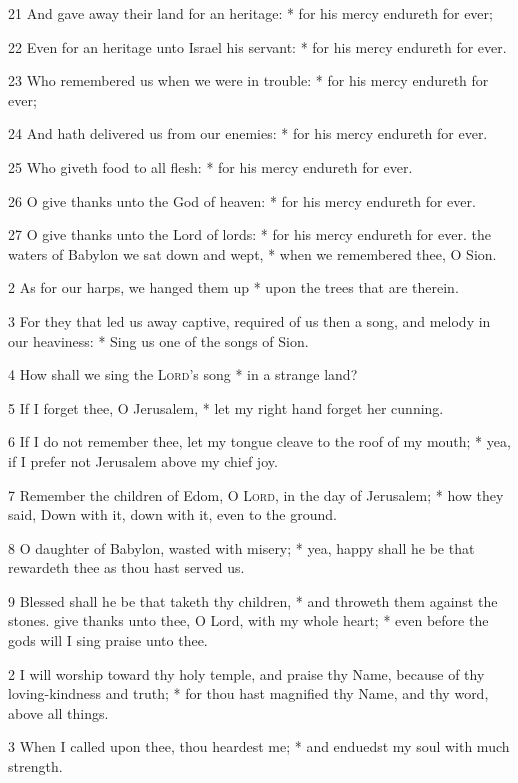 21 And gave away their land for an heritage: * for his mercy endureth for ever;\par
22 Even for an heritage unto Israel his servant: * for his mercy endureth for ever.\par
23 Who remembered us when we were in trouble: * for his mercy endureth for ever;\par
24 And hath delivered us from our enemies: * for his mercy endureth for ever.\par
25 Who giveth food to all flesh: * for his mercy endureth for ever.\par
26 O give thanks unto the God of heaven: * for his mercy endureth for ever.\par
27 O give thanks unto the Lord of lords: * for his mercy endureth for ever.
 the waters of Babylon we sat down and wept, * when we remembered thee, O Sion.\par
2 As for our harps, we hanged them up * upon the trees that are therein.\par
3 For they that led us away captive, required of us then a song, and melody in our heaviness: * Sing us one of the songs of Sion.\par
4 How shall we sing the {\textsc{Lord}}'s song * in a strange land?\par
5 If I forget thee, O Jerusalem, * let my right hand forget her cunning.\par
6 If I do not remember thee, let my tongue cleave to the roof of my mouth; * yea, if I prefer not Jerusalem above my chief joy.\par
7 Remember the children of Edom, O {\textsc{Lord}}, in the day of Jerusalem; * how they said, Down with it, down with it, even to the ground.\par
8 O daughter of Babylon, wasted with misery; * yea, happy shall he be that rewardeth thee as thou hast served us.\par
9 Blessed shall he be that taketh thy children, * and throweth them against the stones.
 give thanks unto thee, O Lord, with my whole heart; * even before the gods will I sing praise unto thee.\par
2 I will worship toward thy holy temple, and praise thy Name, because of thy loving-kindness and truth; * for thou hast magnified thy Name, and thy word, above all things.\par
3 When I called upon thee, thou heardest me; * and enduedst my soul with much strength.\par
